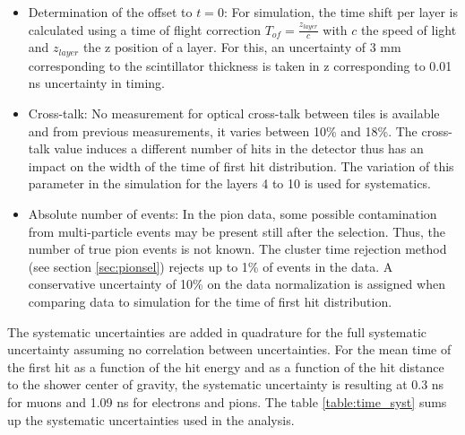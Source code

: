 \documentclass{JINST}
\begin{document}
\begin{itemize}
	\item Determination of the offset to $t=0$: For simulation, the time shift per layer is calculated using a time of flight correction $T_{of} = \frac{z_{layer}}{c}$ with $c$ the speed of light and $z_{layer}$ the z position of a layer. For this, an uncertainty of 3 mm corresponding to the scintillator thickness is taken in z corresponding to 0.01 ns uncertainty in timing.
	\item Cross-talk: No measurement for optical cross-talk between tiles is available and from previous measurements, it varies between 10\% and 18\%. The cross-talk value induces a different number of hits in the detector thus has an impact on the width of the time of first hit distribution. The variation of this parameter in the simulation for the layers 4 to 10 is used for systematics.
	\item Absolute number of events: In the pion data, some possible contamination from multi-particle events may be present still after the selection. Thus, the number of true pion events is not known. The cluster time rejection method (see section \ref{sec:pionsel}) rejects up to 1\% of events in the data. A conservative uncertainty of 10\% on the data normalization is assigned when comparing data to simulation for the time of first hit distribution.
\end{itemize}

The systematic uncertainties are added in quadrature for the full systematic uncertainty assuming no correlation between uncertainties. For the mean time of the first hit as a function of the hit energy and as a function of the hit distance to the shower center of gravity, the systematic uncertainty is resulting at 0.3 ns for muons and 1.09 ns for electrons and pions. The table \ref{table:time_syst} sums up the systematic uncertainties used in the analysis.
\end{document}
